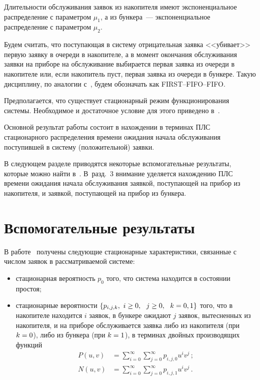 \begin{multicols}{2}
Длительности обслуживания заявок из накопителя имеют экспоненциальное
распределение с параметром $\mu_1$, а из бункера~--- экспоненциальное
распределение с параметром $\mu_2$.

Будем считать, что поступающая
в систему отрицательная заявка <<убивает>> первую заявку в очереди в накопителе,
а в момент окончания обслуживания заявки на приборе на обслуживание выбирается
первая заявка из очереди в накопителе или, если накопитель пуст, первая
заявка из очереди в бункере. Такую дисциплину, по аналогии с~\cite{6}, будем
обозначать как FIRST--FIFO--FIFO.

Предполагается, что существует стационарный режим функционирования системы. Необходимое
и достаточное условие для этого приведено в~\cite{8}.

Основной результат работы состоит в нахождении в терминах
ПЛС стационарного распределения
времени ожидания начала обслуживания поступившей в сис\-те\-му (положительной)
заявки.

В следующем разделе приводятся некоторые вспомогательные результаты, которые
можно найти в~\cite{6, 8}. В~разд.~3 внимание уделяется
нахождению ПЛС времени ожидания начала обслуживания заявкой,
поступающей на прибор из накопителя, и заявкой, поступающей на прибор из бункера.


\section{Вспомогательные результаты}

В работе~\cite{8} получены следующие стационарные характеристики, связанные с
числом заявок в рассматриваемой системе:
\begin{itemize}
\item стационарная вероятность $p_0$ того, что система
находится в состоянии простоя;
\item
стационарные вероятности $\{p_{i,j,k},  \ i \hm\ge 0, \ \ j \hm\ge 0, \ \ k\hm=0,1 \}$ того, что в
накопителе находится $i$ заявок, в бункере ожидают $j$ заявок, вытесненных из накопителя,
и на приборе обслуживается
заявка либо из накопителя (при $k\hm=0$), либо из бункера (при $k\hm=1$),
в терминах двойных производящих функций
\begin{align*}
\label{(11)}
P(u,v) &= \sum\limits_{i=0}^{\infty}
\sum\limits_{j=0}^{\infty}
p_{i,j,0} u^i v^j\,;
\\
N(u,v)&= \sum\limits_{i=0}^{\infty}
\sum\limits_{j=0}^{\infty} p_{i,j,1} u^i v^j\,.
\end{align*}
\end{itemize}


\end{multicols}
